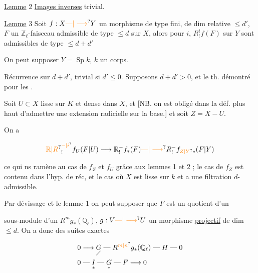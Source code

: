 \uline{Lemme} 2 \quad \uline{Images inverses} \qquad trivial.


\uline{Lemme} 3 \quad Soit $f:X\unsure{\text{---}|\longrightarrow}Y$ un morphisme  de type fini, de dim relative $\leq d'$, $F$ un $\mathbb Z_\ell$-faisceau admissible de type $\leq d$ sur $X$, alors pour  $i$, $R^i_!f(F)$ sur $Y$ sont admissibles de type $\leq d+d'$

\margin{$\Big\downarrow$}

On peut supposer $Y=\operatorname{Sp}k$, $k$ un corps.

Récurrence sur $d+d'$, trivial si $d'\leq0$. Supposons $d+d'>0$, et le th. démontré pour les  .

Soit $U\subset X$  lisse sur $K$ et dense dans $X$, et  [NB. on est obligé dans la déf. plus haut d'admettre une extension radicielle sur la base.] et soit $Z=X-U$.

On a

\[ \unsure{\mathbb R|R}^{\unsure{-|i}}_! f_U(F|U)\longrightarrow \mathbb R^{-}_!f_*(F)\unsure{\text{---}|\longrightarrow}R^{-}_!f_{\unsure{Z|Y}*}(F|Y) \]

ce qui ns ramène au cas de $f_Z$ et $f_U$ grâce aux lemmes 1 et 2 ; le cas de $f_Z$ est contenu dans l'hyp. de réc, et   le cas  où $X$ est lisse sur $k$ et a une filtration $d$-admissible.

Par dévissage et le lemme 1  on peut supposer que $F$ est un quotient  d'un


sous-module  d'un $R^m g_*(\mathbb Q_\ell)$, $g:V\unsure{\text{---}|\longrightarrow}U$ un morphisme \uline{projectif} de dim  $\leq d$. On a donc des suites exactes

\[
\begin{aligned}
0&\longrightarrow \underset{\diagup}{G}\mathrel{\text{---}} R^{\unsure{m|n}}g_*(\mathbb Q_\ell)\mathrel{\text{---}}H\mathrel{\text{---}}0\\
0&\mathrel{\text{---}}\underset{*}{I}\mathrel{\text{---}}\underset{*}{G}\mathrel{\text{---}}F\longrightarrow 0
\end{aligned}
\]

